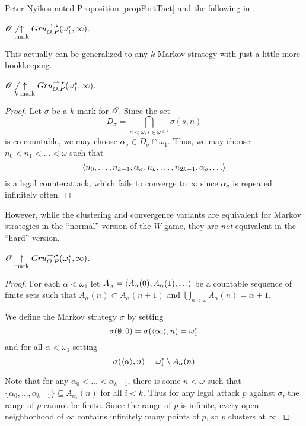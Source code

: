 Peter Nyikos noted Proposition \ref{propFortTact} and the following in
\cite{MR1031771}.

\begin{thm}
  $\mathscr{O} \not\underset{\text{mark}}{\uparrow} Gru_{O,P}^{\to,\star}(\omega^*_1,\infty)$.
\end{thm}

This actually can be generalized to any $k$-Markov strategy with just
a little more bookkeeping.

\begin{thm}
  $\mathscr{O} \not\underset{k\text{-mark}}{\uparrow} Gru_{O,P}^{\to,\star}(\omega^*_1,\infty)$.
\end{thm}

\begin{proof}
  Let $\sigma$ be a $k$-mark for $\mathscr{O}$. Since the set
    \[
      D_\sigma
        =
      \bigcap_{n<\omega,s\in \omega^{\leq k}}
      \sigma(s,n)
    \]
  is co-countable, we may choose $\alpha_\sigma\in D_\sigma\cap\omega_1$.
  Thus, we may choose $n_0<n_1<\dots<\omega$ such that
    \[
      \<n_0,\dots,n_{k-1},\alpha_\sigma,
        n_k,\dots,n_{2k-1},\alpha_\sigma,
        \dots\>
    \]
  is a legal counterattack, which fails to converge to $\infty$ since
  $\alpha_\sigma$ is repeated infinitely often.
\end{proof}

However, while the clustering and convergence variants are equivalent
for Markov strategies in the ``normal'' version of the $W$ game, they are
\textit{not} equivalent in the ``hard'' version.

\begin{thm}
  $\mathscr{O}\underset{\text{mark}}{\uparrow} Gru_{O,P}^{\leadsto,\star}(\omega^*_1,\infty)$.
\end{thm}

\begin{proof}
  For each $\alpha<\omega_1$ let $A_\alpha=\<A_\alpha(0),A_\alpha(1),\dots\>$
  be a countable sequence of finite sets such that
  $A_\alpha(n)\subset A_\alpha(n+1)$ and
  $\bigcup_{n<\omega}A_\alpha(n)=\alpha+1$.

  We define the Markov strategy $\sigma$ by setting
    \[
      \sigma(\emptyset,0) = \sigma(\langle\infty\rangle,n) = \omega^*_1
    \]
  and for all $\alpha<\omega_1$ setting
    \[
      \sigma(\langle\alpha\rangle,n) = \omega^*_1 \setminus A_\alpha(n)
    \]

  Note that for any $\alpha_0<\dots<\alpha_{k-1}$, there is some $n<\omega$
  such that
  $\{\alpha_0,\dots,\alpha_{k-1}\}\subseteq A_{\alpha_i}(n)$ for all $i<k$.
  Thus for any legal attack $p$ against $\sigma$, the range of $p$ cannot
  be finite. Since the range of $p$ is infinite, every open neighborhood of
  $\infty$ contains infinitely many points of $p$, so $p$ clusters at $\infty$.
\end{proof}

